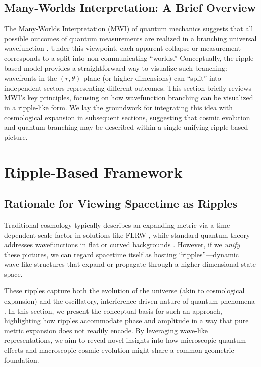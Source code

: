 \documentclass{article}
\begin{document}
\subsection{Many-Worlds Interpretation: A Brief Overview}
\label{subsec:manyworlds-overview}
The Many-Worlds Interpretation (MWI) of quantum mechanics suggests that 
all possible outcomes of quantum measurements are realized in a 
branching universal wavefunction \cite{everett1957, dewitt1971}. Under 
this viewpoint, each apparent collapse or measurement corresponds to a 
split into non-communicating ``worlds.'' Conceptually, the ripple-based 
model provides a straightforward way to visualize such branching: 
wavefronts in the \((r,\theta)\) plane (or higher dimensions) can 
``split'' into independent sectors representing different outcomes. 
This section briefly reviews MWI’s key principles, focusing on how 
wavefunction branching can be visualized in a ripple-like form. We lay 
the groundwork for integrating this idea with cosmological expansion 
in subsequent sections, suggesting that cosmic evolution and quantum 
branching may be described within a single unifying ripple-based picture.
\section{Ripple-Based Framework}
\label{sec:ripple-framework}

\subsection{Rationale for Viewing Spacetime as Ripples}
\label{subsec:rationale-ripples}
Traditional cosmology typically describes an expanding metric via a 
time-dependent scale factor in solutions like FLRW \cite{rindler1977essential, misner1973}, 
while standard quantum theory addresses wavefunctions in flat or curved 
backgrounds \cite{griffiths2005introduction, feynmanlectures}. 
However, if we \emph{unify} these pictures, we can regard spacetime 
itself as hosting ``ripples''---dynamic wave-like structures that expand 
or propagate through a higher-dimensional state space. 

These ripples capture both the evolution of the universe (akin to cosmological 
expansion) and the oscillatory, interference-driven nature of quantum phenomena 
\cite{wigner1932, husimi1940some}. In this section, we present the conceptual 
basis for such an approach, highlighting how ripples accommodate phase and 
amplitude in a way that pure metric expansion does not readily encode. By 
leveraging wave-like representations, we aim to reveal novel insights into 
how microscopic quantum effects and macroscopic cosmic evolution might share 
a common geometric foundation.
\end{document}
